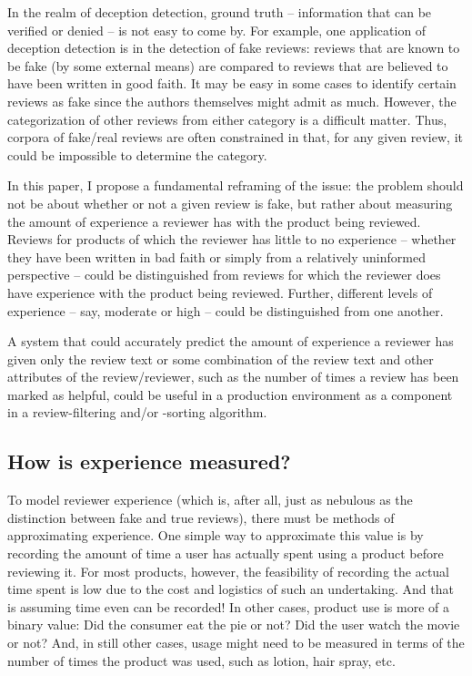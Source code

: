 \documentclass[9pt]{article}
\begin{document}
In the realm of deception detection, ground truth -- information that can be verified or denied -- is not easy to come by. For example, one application of deception detection is in the detection of fake reviews: reviews that are known to be fake (by some external means) are compared to reviews that are believed to have been written in good faith. It may be easy in some cases to identify certain reviews as fake since the authors themselves might admit as much. However, the categorization of other reviews from either category is a difficult matter. Thus, corpora of fake/real reviews are often constrained in that, for any given review, it could be impossible to determine the category.

In this paper, I propose a fundamental reframing of the issue: the problem should not be about whether or not a given review is fake, but rather about measuring the amount of experience a reviewer has with the product being reviewed. Reviews for products of which the reviewer has little to no experience -- whether they have been written in bad faith or simply from a relatively uninformed perspective -- could be distinguished from reviews for which the reviewer does have experience with the product being reviewed. Further, different levels of experience -- say, moderate or high -- could be distinguished from one another.

A system that could accurately predict the amount of experience a reviewer has given only the review text or some combination of the review text and other attributes of the review/reviewer, such as the number of times a review has been marked as helpful, could be useful in a production environment as a component in a review-filtering and/or -sorting algorithm.

\subsection{How is experience measured?}

To model reviewer experience (which is, after all, just as nebulous as the distinction between fake and true reviews), there must be methods of approximating experience. One simple way to approximate this value is by recording the amount of time a user has actually spent using a product before reviewing it. For most products, however, the feasibility of recording the actual time spent is low due to the cost and logistics of such an undertaking. And that is assuming time even can be recorded! In other cases, product use is more of a binary value: Did the consumer eat the pie or not? Did the user watch the movie or not? And, in still other cases, usage might need to be measured in terms of the number of times the product was used, such as lotion, hair spray, etc.
\end{document}
